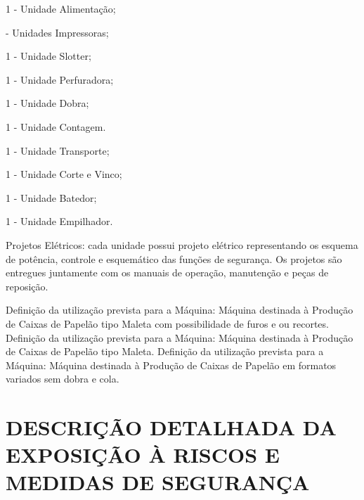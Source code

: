 \begin{machinePartsList}
    \item[\ding{\dingNumber}] 1 - Unidade Alimentação;
    \item[\ding{\dingNumber}] \numberOfPrinters \space - Unidades Impressoras;
    \ifmachineTypeFlexo
        \item[\ding{\dingNumber}] 1 - Unidade Slotter;
        \ifunidadePerfuradora
        \item[\ding{\dingNumber}] 1 - Unidade Perfuradora;
        \fi
        \item[\ding{\dingNumber}] 1 - Unidade Dobra;
        \item[\ding{\dingNumber}] 1 - Unidade Contagem.
    \fi
    \ifmachineTypeIcv
        \item[\ding{\dingNumber}] 1 - Unidade Transporte;
        \item[\ding{\dingNumber}] 1 - Unidade Corte e Vinco;
        \item[\ding{\dingNumber}] 1 - Unidade Batedor;
        \item[\ding{\dingNumber}] 1 - Unidade Empilhador.
    \fi
\end{machinePartsList}

Projetos Elétricos: cada unidade possui projeto elétrico representando os esquema de potência, controle e esquemático das
 funções de segurança. Os projetos são entregues juntamente com os manuais de operação, manutenção e
 peças de reposição.

 \ifmachineTypeFlexo

  \ifunidadePerfuradora
       Definição da utilização prevista para a Máquina:
 Máquina destinada à Produção de Caixas de Papelão tipo Maleta com possibilidade de furos e ou recortes.
 \else
 Definição da utilização prevista para a Máquina:
 Máquina destinada à Produção de Caixas de Papelão tipo Maleta.
    \fi
\fi
\ifmachineTypeIcv
Definição da utilização prevista para a Máquina:
Máquina destinada à Produção de Caixas de Papelão em formatos variados sem dobra e cola.
\fi

\newpage

\thispagestyle{fancy}

\vspace*{40 pt}

\section{\large{\MakeUppercase{Descrição detalhada da Exposição à Riscos e Medidas de Segurança}}}

